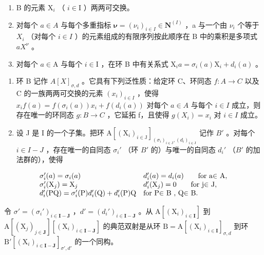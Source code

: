 \begin{enumerate}
\def\labelenumi{(\roman{enumi})}
\item
  B 的元素 \(\mathrm{X}_i\) （ \(i \in \mathrm{I}\) ）两两可交换。
\item
  对每个 \(a \in A\) 与每个多重指标 \(\boldsymbol{\nu} = (\nu_i)_{i \in I} \in \mathbf{N}^{(I)}\) ，a 与一个由 \(\nu_i\) 个等于 \(X_i\) （对每个 \(i \in I\) ）的元素组成的有限序列按此顺序在 B 中的乘积是多项式 \(aX^\nu\) 。
\item
  对每个 \(a \in \mathrm{A}\) 与每个 \(i \in \mathrm{I}\) ，在环 B 中有关系式 \(\mathrm{X}_i a = \sigma_i(a)\mathrm{X}_i + d_i(a)\) 。
\end{enumerate}

\begin{enumerate}
\def\labelenumi{\alph{enumi})}
\setcounter{enumi}{1}
\item
  环 B 记作 \(A[X]_{\sigma,d}\) 。它具有下列泛性质：给定环 C、环同态 \(f: A \to C\) 以及 C 的一族两两可交换的元素 \((x_i)_{i \in I}\) ，使得 \(x_i f(a) = f(\sigma_i(a)) x_i + f(d_i(a))\) 对每个 \(a \in A\) 与每个 \(i \in I\) 成立，则存在唯一的环同态 \(g: B \to C\) ，它延拓 f，且使得 \(g(X_i) = x_i\) 对 \(i \in I\) 成立。
\item
  设 J 是 I 的一个子集。把环 \(\mathrm{A}[(\mathrm{X}_{i})_{i\in\mathrm{J}}]_{(\sigma_{i})_{i\in\mathrm{J}},(d_{i})_{i\in\mathrm{J}}}\) 记作 \(B'\) 。对每个 \(i\in I-J\) ，存在唯一的自同态 \(\sigma_{i}'\) （环 \(B'\) 的）与唯一的自同态 \(d_{i}'\) （\(B'\) 的加法群的），使得
\end{enumerate}

\[
\begin{array}{l l} \sigma_ {i} ^ {\prime} (a) = \sigma_ {i} (a) & d _ {i} ^ {\prime} (a) = d _ {i} (a) \qquad \text {for a\ensuremath{\in} A}, \\ \sigma_ {i} ^ {\prime} (\mathrm{X} _ {j}) = \mathrm{X} _ {j} & d _ {i} ^ {\prime} (\mathrm{X} _ {j}) = 0 \qquad \text {for j\ensuremath{\in} J}, \\ d _ {i} ^ {\prime} (\mathrm{PQ}) = \sigma_ {i} ^ {\prime} (\mathrm{P}) d _ {i} ^ {\prime} (\mathrm{Q}) + d _ {i} ^ {\prime} (\mathrm{P}) \mathrm{Q} & \text {for P\ensuremath{\in} B , Q\ensuremath{\in} B}. \end{array}
\]

令 \(\sigma' = (\sigma_i')_{i \in \mathbf{I} - \mathbf{J}}\) ，\(d' = (d_i')_{i \in \mathbf{I} - \mathbf{J}}\) 。从 \(\mathrm{A}[(\mathrm{X}_i)_{i \in \mathbf{I}}]\) 到 \(\mathrm{A}[(\mathrm{X}_j)_{j \in \mathbf{J}}][(\mathrm{X}_i)_{i \in \mathbf{I} - \mathbf{J}}]\) 的典范双射是从环 \(\mathrm{B} = \mathrm{A}[(\mathrm{X}_i)_{i \in \mathbf{I}}]_{\sigma, d}\) 到环 \(\mathrm{B}'[(\mathrm{X}_i)_{i \in \mathbf{I} - \mathbf{J}}]_{\sigma', d'}\) 的一个同构。

